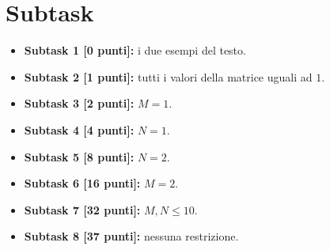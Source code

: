   \section*{Subtask}
  \begin{itemize}
    \item \textbf{Subtask 1 [0 punti]:} i due esempi del testo.
    \item \textbf{Subtask 2 [1 punti]:} tutti i valori della matrice uguali ad $1$.
    \item \textbf{Subtask 3 [2 punti]:} $M=1$.
    \item \textbf{Subtask 4 [4 punti]:} $N=1$.
    \item \textbf{Subtask 5 [8 punti]:} $N=2$.
    \item \textbf{Subtask 6 [16 punti]:} $M=2$.
    \item \textbf{Subtask 7 [32 punti]:} $M,N \leq 10$.
    \item \textbf{Subtask 8 [37 punti]:} nessuna restrizione.
  \end{itemize}
  
